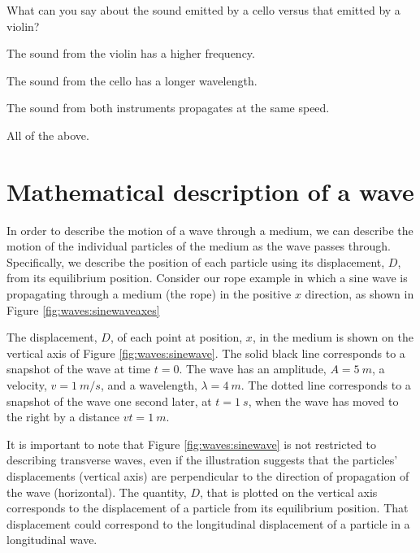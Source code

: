 \begin{checkpoint}
\begin{MCquestion}{What can you say about the sound emitted by a cello versus that emitted by a violin?}
\item The sound from the violin has a higher frequency.
\item The sound from the cello has a longer wavelength.
\item The sound from both instruments propagates at the same speed.
\item All of the above. \correct
\end{MCquestion}
\end{checkpoint}

\section{Mathematical description of a wave}
In order to describe the motion of a wave through a medium, we can describe the motion of the individual particles of the medium as the wave passes through. Specifically, we describe the position of each particle using its displacement, $D$, from its equilibrium position. Consider our rope example in which a sine wave is propagating through a medium (the rope) in the positive $x$ direction, as shown in Figure \ref{fig:waves:sinewaveaxes}


The displacement, $D$, of each point at position, $x$, in the medium is shown on the vertical axis of Figure \ref{fig:waves:sinewave}. The solid black line corresponds to a snapshot of the wave at time $t=0$. The wave has an amplitude, $A=\SI{5}{m}$, a velocity, $v=\SI{1}{m/s}$, and a wavelength, $\lambda=\SI{4}{m}$. The dotted line corresponds to a snapshot of the wave one second later, at $t=\SI{1}{s}$, when the wave has moved to the right by a distance $vt=\SI{1}{m}$.

It is important to note that Figure \ref{fig:waves:sinewave} is not restricted to describing transverse waves, even if the illustration suggests that the particles' displacements (vertical axis) are perpendicular to the direction of propagation of the wave (horizontal). The quantity, $D$, that is plotted on the vertical axis corresponds to the displacement of a particle from its equilibrium position. That displacement could correspond to the longitudinal displacement of a particle in a longitudinal wave.

